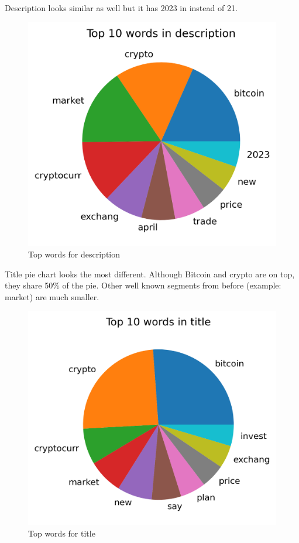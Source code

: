 Description looks similar as well but it has 2023 in instead of 21.
\begin{figure}[H]
\includegraphics[scale=1]{img/B2/top_words_description.png}
\centering
\caption{Top words for description}
\label{fig:top_words_description}
\end{figure}

Title pie chart looks the most different. Although Bitcoin and crypto are on top, they share 50\% of the pie. Other well known segments from before (example: market) are much smaller.
\begin{figure}[H]
\includegraphics[scale=1]{img/B2/top_words_title.png}
\centering
\caption{Top words for title}
\label{fig:top_words_title}
\end{figure}

